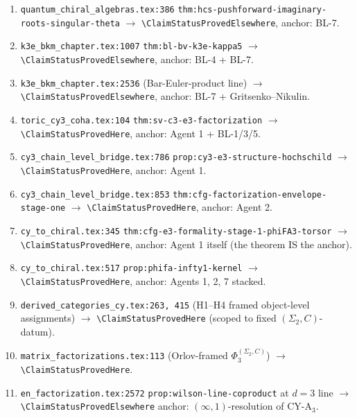 \documentclass[11pt]{amsart}
\begin{document}
{{\begin{enumerate}[label=\textsc{U-\arabic*},leftmargin=*]
\item \texttt{quantum\_chiral\_algebras.tex:386} \texttt{thm:hcs-pushforward-imaginary-roots-singular-theta} $\to$ \texttt{\textbackslash ClaimStatusProvedElsewhere}, anchor: BL-7.
\item \texttt{k3e\_bkm\_chapter.tex:1007} \texttt{thm:bl-bv-k3e-kappa5} $\to$ \texttt{\textbackslash ClaimStatusProvedElsewhere}, anchor: BL-4 + BL-7.
\item \texttt{k3e\_bkm\_chapter.tex:2536} (Bar-Euler-product line) $\to$ \texttt{\textbackslash ClaimStatusProvedElsewhere}, anchor: BL-7 + Gritsenko--Nikulin.
\item \texttt{toric\_cy3\_coha.tex:104} \texttt{thm:sv-c3-e3-factorization} $\to$ \texttt{\textbackslash ClaimStatusProvedHere}, anchor: Agent 1 + BL-1/3/5.
\item \texttt{cy3\_chain\_level\_bridge.tex:786} \texttt{prop:cy3-e3-structure-hochschild} $\to$ \texttt{\textbackslash ClaimStatusProvedHere}, anchor: Agent 1.
\item \texttt{cy3\_chain\_level\_bridge.tex:853} \texttt{thm:cfg-factorization-envelope-stage-one} $\to$ \texttt{\textbackslash ClaimStatusProvedHere}, anchor: Agent 2.
\item \texttt{cy\_to\_chiral.tex:345} \texttt{thm:cfg-e3-formality-stage-1-phiFA3-torsor} $\to$ \texttt{\textbackslash ClaimStatusProvedHere}, anchor: Agent 1 itself (the theorem IS the anchor).
\item \texttt{cy\_to\_chiral.tex:517} \texttt{prop:phifa-infty1-kernel} $\to$ \texttt{\textbackslash ClaimStatusProvedHere}, anchor: Agents 1, 2, 7 stacked.
\item \texttt{derived\_categories\_cy.tex:263, 415} (H1--H4 framed object-level assignments) $\to$ \texttt{\textbackslash ClaimStatusProvedHere} (scoped to fixed $(\Sigma_2,C)$-datum).
\item \texttt{matrix\_factorizations.tex:113} (Orlov-framed $\Phi_3^{(\Sigma_2,C)}$) $\to$ \texttt{\textbackslash ClaimStatusProvedHere}.
\item \texttt{en\_factorization.tex:2572} \texttt{prop:wilson-line-coproduct} at $d = 3$ line $\to$ \texttt{\textbackslash ClaimStatusProvedElsewhere} anchor: $(\infty,1)$-resolution of CY-A$_3$.
\end{enumerate}

}}
\end{document}
